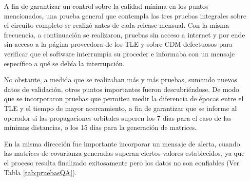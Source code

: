 A fin de garantizar un control sobre la calidad m\'inima en los puntos mencionados, una prueba general que contempla las tres pruebas integrales sobre el circuito completo se realiz\'o antes de cada release mensual. Con la misma frecuencia, a continuaci\'on se realizaron, pruebas sin acceso a internet y por ende sin acceso a la p\'agina proveedora de los TLE y sobre CDM defectuosos para verificar que el software interrump\'ia su proceder e informaba con un mensaje espec\'ifico a qu\'e se deb\'ia la interrupci\'on.

No obstante, a medida que se realizaban m\'as y m\'as pruebas, sumando nuevos datos de validaci\'on, otros puntos importantes fueron descubri\'endose. De modo que se incorporaron pruebas que permiten medir la diferencia de \'epocas entre el TLE y el tiempo de mayor acercamiento, a fin de garantizar que se informe al operador si las propagaciones orbitales superen los 7 d\'ias para el caso de las m\'inimas distancias, o los 15 d\'ias para la generaci\'on de matrices. 

En la misma direcci\'on fue importante incorporar un mensaje de alerta, cuando las matrices de covarianza generadas superan ciertos valores establecidos, ya que el proceso resulta finalizado exitosamente pero los datos no son confiables (Ver Tabla \ref{tab:pruebasQA}).

\begin{table}[!h]
\caption[Pruebas de Aseguramiento de la Calidad]{Pruebas de Aseguramiento de la Calidad que se realizaron antes de cada release, aproximadamente una vez al mes.}
\label{tab:pruebasQA}
\end{table}

